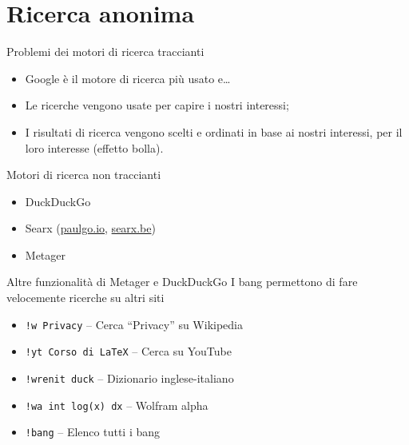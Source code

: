 
\section{Ricerca anonima}

\begin{myframe}{Problemi dei motori di ricerca traccianti}
  \begin{itemize}[<+->]
    \item Google è il motore di ricerca più usato e\dots{}
    \item Le ricerche vengono usate per capire i nostri interessi;
    \item I risultati di ricerca vengono scelti e ordinati in base ai nostri interessi, per il loro interesse (effetto bolla).
  \end{itemize}
\end{myframe}

\begin{myframe}{Motori di ricerca non traccianti}
  \begin{itemize}
    \item DuckDuckGo
    \item Searx (\url{paulgo.io}, \url{searx.be})
    \item Metager
  \end{itemize}
\end{myframe}

\begin{myframe}{Altre funzionalità di Metager e DuckDuckGo}
  I bang permettono di fare velocemente ricerche su altri siti
  \begin{itemize}[<+->]
    \item \texttt{!w Privacy} -- Cerca ``Privacy'' su Wikipedia
    \item \texttt{!yt Corso di LaTeX} -- Cerca su YouTube
    \item \texttt{!wrenit duck} -- Dizionario inglese-italiano
    \item \texttt{!wa int log(x) dx} -- Wolfram alpha
    \item \texttt{!bang} -- Elenco tutti i bang
  \end{itemize}
\end{myframe}


